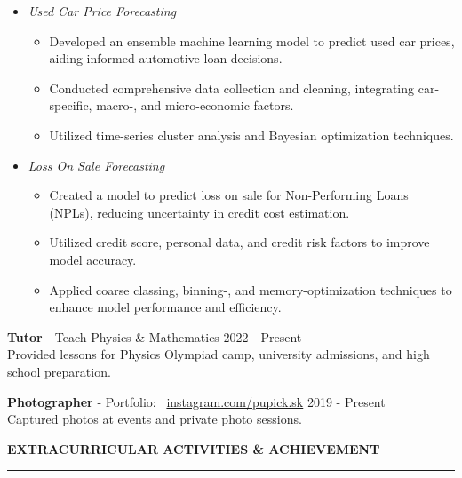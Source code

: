 \documentclass[11pt]{article}
\begin{document}
\begin{itemize}[topsep=0pt, parsep=0pt]
    \item \textit{Used Car Price Forecasting}
    {\fontsize{10pt}{11pt}\selectfont
    \begin{itemize}[noitemsep, topsep=0pt, partopsep=0pt, parsep=0pt, leftmargin=*]
        \item Developed an ensemble machine learning model to predict used car prices, aiding informed automotive loan decisions.
        \item Conducted comprehensive data collection and cleaning, integrating car-specific, macro-, and micro-economic factors.
        \item Utilized time-series cluster analysis and Bayesian optimization techniques.
    \end{itemize}
    }
    \item \textit{Loss On Sale Forecasting}
    {\fontsize{10pt}{11pt}\selectfont
    \begin{itemize}[noitemsep, topsep=0pt, partopsep=0pt, parsep=0pt, leftmargin=*]
        \item Created a model to predict loss on sale for Non-Performing Loans (NPLs), reducing uncertainty in credit cost estimation.
        \item Utilized credit score, personal data, and credit risk factors to improve model accuracy.
        \item Applied coarse classing, binning-, and memory-optimization techniques to enhance model performance and efficiency.
    \end{itemize}
    }
\end{itemize}

\textbf{Tutor} - Teach Physics \& Mathematics \hfill 2022 - Present\\
\hspace*{7pt} Provided lessons for Physics Olympiad camp, university admissions, and high school preparation.

\vspace{3pt}

\textbf{Photographer} - Portfolio: \faInstagram\ \href{https://www.instagram.com/pupick.sk}{instagram.com/pupick.sk} \hfill 2019 - Present\\
\hspace*{7pt} Captured photos at events and private photo sessions.

\vspace{9pt}
\textbf{EXTRACURRICULAR ACTIVITIES \& ACHIEVEMENT}
\vspace{5pt}
{\color{NavyBlue}\hrule}
\vspace{6pt}
\end{document}
